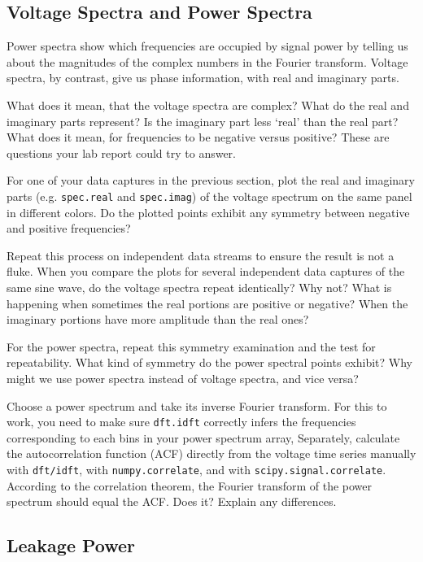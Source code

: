 \documentclass[11pt,preprint]{aastex}
\begin{document}
\subsection{Voltage Spectra and Power Spectra}

\noindent
Power spectra show which frequencies are occupied by signal power by telling
us about the magnitudes of the complex numbers in the Fourier transform.  Voltage
spectra, by contrast, give us phase information,
with real and imaginary parts.

What does it mean, that the voltage spectra are complex? What do the real
and imaginary parts represent? Is the imaginary part less `real'
than the real part?
What does it mean, for frequencies to be negative versus
positive? These are questions your lab report could try to answer.

For one of your data captures in the previous section, plot the real and imaginary parts
(e.g. {\tt spec.real} and {\tt spec.imag})
of the voltage spectrum on the same panel in different colors.
Do the plotted points 
exhibit any symmetry between negative and positive
frequencies?

Repeat this process on independent data
streams to ensure the result is not a fluke.
When you compare the plots for several independent data captures of the same sine wave, do the
voltage spectra repeat identically?  Why not? What is happening when
sometimes the real portions are positive or negative? When the imaginary
portions have more amplitude than the real ones?

For the power spectra, repeat this symmetry examination and the test for
repeatability. What kind of symmetry do the power spectral points
exhibit? Why might we use power spectra instead of voltage spectra, and vice versa?

Choose a power spectrum and take its inverse Fourier transform.
For this to work, you need to make sure {\tt dft.idft} correctly infers
the frequencies corresponding to each bins in your power spectrum array,
Separately, calculate the autocorrelation function (ACF) directly from 
the voltage time series manually with {\tt dft/idft}, with \verb$numpy.correlate$, and with \verb$scipy.signal.correlate$.
According to the correlation theorem, the Fourier transform
of the power spectrum should equal the ACF. Does it? Explain any differences.

\subsection{Leakage Power} \label{subleakage}
\end{document}
